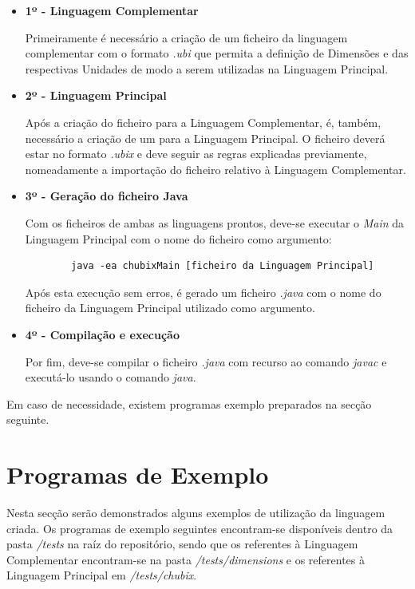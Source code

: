 \documentclass[10pt,portuguese]{article}
\begin{document}
\begin{itemize}
    \item \textbf{1º - Linguagem Complementar}
    \par Primeiramente é necessário a criação de um ficheiro da linguagem complementar com o formato \textit{.ubi} que permita a definição de Dimensões e das respectivas Unidades de modo a serem utilizadas na Linguagem Principal. 
    \item \textbf{2º - Linguagem Principal}
    \par Após a criação do ficheiro para a Linguagem Complementar, é, também, necessário a criação de um para a Linguagem Principal. O ficheiro deverá estar no formato \textit{.ubix} e deve seguir as regras explicadas previamente, nomeadamente a importação do ficheiro relativo à Linguagem Complementar.
    \item \textbf{3º - Geração do ficheiro Java}
    \par Com os ficheiros de ambas as linguagens prontos, deve-se executar o \textit{Main} da Linguagem Principal com o nome do ficheiro como argumento:
    \begin{lstlisting}
        java -ea chubixMain [ficheiro da Linguagem Principal]
    \end{lstlisting}
    \par Após esta execução sem erros, é gerado um ficheiro \textit{.java} com o nome do ficheiro da Linguagem Principal utilizado como argumento.
    \item \textbf{4º - Compilação e execução}
    \par Por fim, deve-se compilar o ficheiro \textit{.java} com recurso ao comando \textit{javac} e executá-lo usando o comando \textit{java}. 
\end{itemize}

\par Em caso de necessidade, existem programas exemplo preparados na secção seguinte.

\clearpage

\section{Programas de Exemplo}

\par Nesta secção serão demonstrados alguns exemplos de utilização da linguagem criada. Os programas de exemplo seguintes encontram-se disponíveis dentro da pasta \textit{/tests} na raíz do repositório, sendo que os referentes à Linguagem Complementar encontram-se na pasta \textit{/tests/dimensions} e os referentes à Linguagem Principal em \textit{/tests/chubix}.
\end{document}
